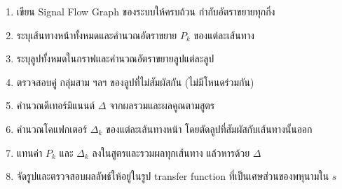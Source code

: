 \begin{enumerate}
    \item เขียน Signal Flow Graph ของระบบให้ครบถ้วน กำกับอัตราขยายทุกกิ่ง
    \item ระบุเส้นทางหน้าทั้งหมดและคำนวณอัตราขยาย $P_k$ ของแต่ละเส้นทาง
    \item ระบุลูปทั้งหมดในกราฟและคำนวณอัตราขยายลูปแต่ละลูป
    \item ตรวจสอบคู่ กลุ่มสาม ฯลฯ ของลูปที่ไม่สัมผัสกัน (ไม่มีโหนดร่วมกัน)
    \item คำนวณดีเทอร์มิแนนต์ $\Delta$ จากผลรวมและผลคูณตามสูตร
    \item คำนวณโคแฟกเตอร์ $\Delta_k$ ของแต่ละเส้นทางหน้า โดยตัดลูปที่สัมผัสกับเส้นทางนั้นออก
    \item แทนค่า $P_k$ และ $\Delta_k$ ลงในสูตรและรวมผลทุกเส้นทาง แล้วหารด้วย $\Delta$
    \item จัดรูปและตรวจสอบผลลัพธ์ให้อยู่ในรูป transfer function ที่เป็นเศษส่วนของพหุนามใน $s$
\end{enumerate}



